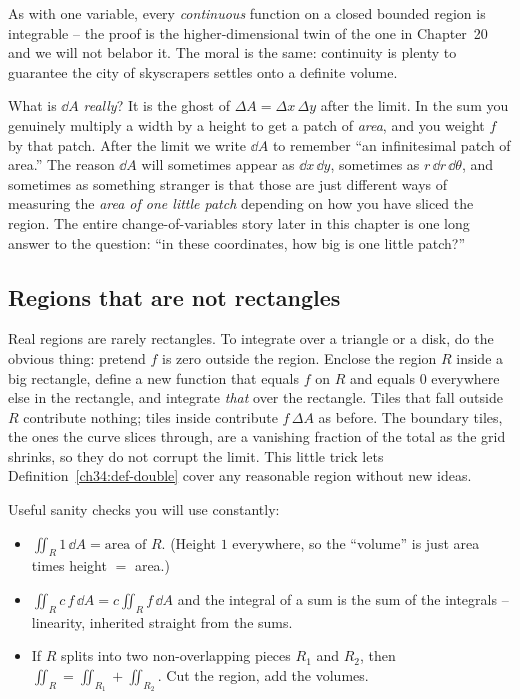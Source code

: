As with one variable, every \emph{continuous} function on a closed bounded region
is integrable -- the proof is the higher-dimensional twin of the one in
Chapter~20 and we will not belabor it. The moral is the same: continuity is
plenty to guarantee the city of skyscrapers settles onto a definite volume.

\begin{happeningbox}
What is $\dd A$ \emph{really}? It is the ghost of $\Delta A=\Delta x\,\Delta y$
after the limit. In the sum you genuinely multiply a width by a height to get a
patch of \emph{area}, and you weight $f$ by that patch. After the limit we write
$\dd A$ to remember ``an infinitesimal patch of area.'' The reason $\dd A$ will
sometimes appear as $\dd x\,\dd y$, sometimes as $r\,\dd r\,\dd\theta$, and
sometimes as something stranger is that those are just different ways of
measuring the \emph{area of one little patch} depending on how you have sliced
the region. The entire change-of-variables story later in this chapter is one
long answer to the question: ``in these coordinates, how big is one little
patch?''
\end{happeningbox}

\subsection{Regions that are not rectangles}

Real regions are rarely rectangles. To integrate over a triangle or a disk, do
the obvious thing: pretend $f$ is zero outside the region. Enclose the region $R$
inside a big rectangle, define a new function that equals $f$ on $R$ and equals
$0$ everywhere else in the rectangle, and integrate \emph{that} over the
rectangle. Tiles that fall outside $R$ contribute nothing; tiles inside
contribute $f\,\Delta A$ as before. The boundary tiles, the ones the curve slices
through, are a vanishing fraction of the total as the grid shrinks, so they do
not corrupt the limit. This little trick lets Definition~\ref{ch34:def-double}
cover any reasonable region without new ideas.

\begin{focusbox}
Useful sanity checks you will use constantly:
\begin{itemize}
\item $\displaystyle\iint_R 1\,\dd A=\text{area of }R$. (Height $1$ everywhere,
so the ``volume'' is just area times height $=$ area.)
\item $\displaystyle\iint_R c\,f\,\dd A=c\iint_R f\,\dd A$ and the integral of a
sum is the sum of the integrals -- linearity, inherited straight from the sums.
\item If $R$ splits into two non-overlapping pieces $R_1$ and $R_2$, then
$\iint_R=\iint_{R_1}+\iint_{R_2}$. Cut the region, add the volumes.
\end{itemize}
\end{focusbox}

